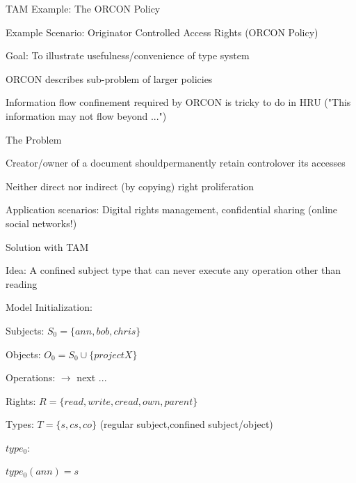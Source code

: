 \documentclass[a4paper]{article}
\begin{document}
\begin{multicols}{3}
    TAM Example: The ORCON Policy
    \begin{itemize*}
        \item Example Scenario: Originator Controlled Access Rights (ORCON Policy)
        \item Goal: To illustrate usefulness/convenience of type system
        \begin{itemize*}
            \item ORCON describes sub-problem of larger policies
            \item Information flow confinement required by ORCON is tricky to do in HRU ("This information may not flow beyond ...")
        \end{itemize*}
        \item The Problem
        \begin{itemize*}
            \item Creator/owner of a document shouldpermanently retain controlover its accesses
            \item Neither direct nor indirect (by copying) right proliferation
            \item Application scenarios: Digital rights management, confidential sharing (online social networks!)
            \item %
        \end{itemize*}
        \item Solution with TAM
        \begin{itemize*}
            \item Idea: A confined subject type that can never execute any operation other than reading
            \item Model Initialization:
            \begin{itemize*}
                \item Subjects: $S_0=\{ann,bob,chris\}$
                \item Objects: $O_0 =S_0\cup\{projectX\}$
                \item Operations: $\rightarrow$ next ...
                \item Rights: $R=\{read,write,cread,own,parent\}$
                \item Types: $T=\{s,cs,co\}$ (regular subject,confined subject/object)
                \item $type_0$:
                \begin{itemize*}
                    \item $type_0(ann)=s$

\end{itemize*}
\end{itemize*}
\end{itemize*}
\end{itemize*}
\end{multicols}
\end{document}
